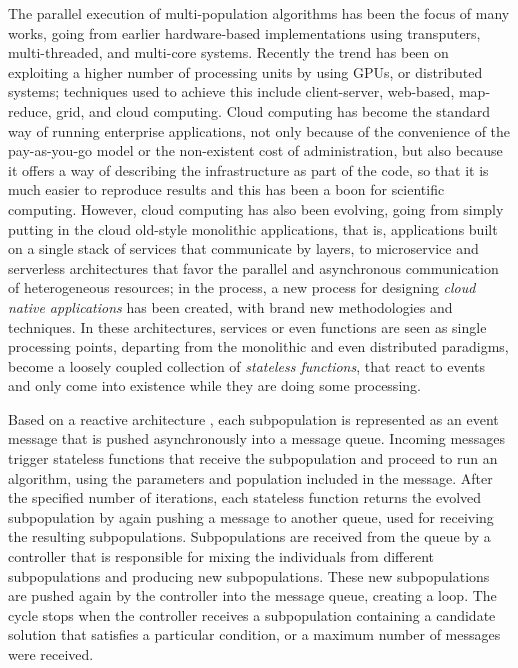 \documentclass[review]{elsarticle}
\begin{document}
The parallel execution of multi-population algorithms has been the focus of many
works,  going from earlier hardware-based implementations using transputers,
multi-threaded, and multi-core systems. %
Recently the trend has been on
exploiting a higher number of processing units by using GPUs, or distributed
systems; techniques used to achieve this include client-server, web-based, map-reduce,  grid, and cloud computing. %
Cloud
computing has become the standard way of running enterprise applications, not
only because of the convenience of the pay-as-you-go model or the non-existent
cost of administration, but also because it offers a way of describing the
infrastructure as part of the code, so that it is much easier to reproduce
results and this has been a boon for scientific computing.  However,  cloud computing
has also been evolving, going from simply putting in the cloud old-style monolithic applications, that is,
applications built on a single stack of services that communicate by layers, to
microservice and serverless architectures that favor the parallel and
asynchronous communication of heterogeneous resources; in the process, a new process for designing {\em cloud native applications} has been created, with brand new methodologies and techniques. In these architectures,
services or even functions are seen as single processing points,  departing
from the monolithic and even distributed paradigms, become a loosely coupled collection of 
{\em stateless functions}, that react to events and only come into existence while they 
are doing some processing. %

Based on a reactive architecture \cite{guervos2018introducing} , each
subpopulation is represented as an event message that is pushed asynchronously
into a message queue. Incoming messages trigger stateless functions that receive
the subpopulation and proceed to run an algorithm, using the parameters and
population included in the message. After the specified number of iterations,
each stateless function returns the evolved subpopulation by again pushing a
message to another queue, used for receiving the resulting subpopulations.
Subpopulations are received from the queue by a controller that is responsible
for mixing the individuals from different subpopulations and producing new
subpopulations. These new subpopulations are pushed again by the controller into
the message queue, creating a loop. The cycle stops when the controller receives
a subpopulation containing a candidate solution that satisfies a particular
condition, or a maximum number of messages were received.
\end{document}
